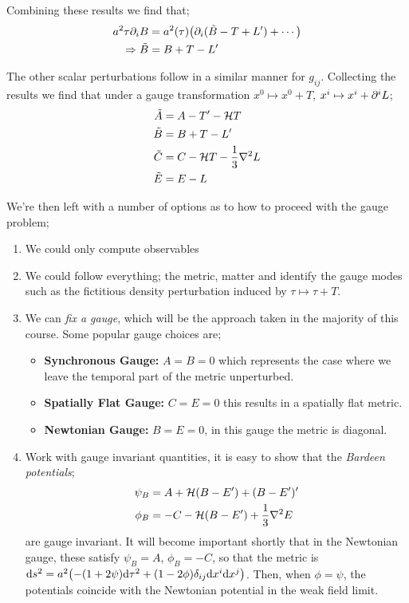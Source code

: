 Combining these results we find that;
\begin{align*}
a^2\tau \del_i B &= a^2(\tau)\left(\del_i(\tilde{B} - T + L\pr) + \cdots\right) \\
\Rightarrow \tilde{B} &= B + T - L\pr
\end{align*}
\begin{definitionbox}
The other scalar perturbations follow in a similar manner for $g_{ij}$. Collecting the results we find that under a gauge transformation $x^{0} \mapsto x^{0} + T$, $x^{i} \mapsto x^{i} + \partial^i L$;
\begin{align}
\tilde{A} &= A - T^{\prime} - \mathcal{H} T \\
\tilde{B} &= B + T - L^{\prime} \\
\tilde{C} &= C - \mathcal{H} T - \frac{1}{3}\nabla^2 L \\
\tilde{E} &= E - L
\end{align}
\end{definitionbox}
We're then left with a number of options as to how to proceed with the gauge problem;
\begin{enumerate}
\item We could only compute observables
\item We could follow everything; the metric, matter and identify the gauge modes such as the fictitious density perturbation induced by $\tau \mapsto \tau + T$.
\item We can \emph{fix a gauge}, which will be the approach taken in the majority of this course. Some popular gauge choices are;
\begin{itemize}
\item \textbf{Synchronous Gauge:} $A = B = 0$ which represents the case where we leave the temporal part of the metric unperturbed.
\item \textbf{Spatially Flat Gauge:} $C = E = 0$ this results in a spatially flat metric.
\item \textbf{Newtonian Gauge:} $B = E = 0$, in this gauge the metric is diagonal.
\end{itemize}
\item Work with gauge invariant quantities, it is easy to show that the \emph{Bardeen potentials};
\begin{align}
\psi_B &= A + \mathcal{H}(B - E^{\prime}) + (B - E^{\prime})^{\prime} \\
\phi_B &= -C - \mathcal{H}(B - E^{\prime}) + \frac{1}{3}\nabla^2 E
\end{align}
are gauge invariant. It will become important shortly that in the Newtonian gauge, these satisfy $\psi_B = A$, $\phi_B = -C$, so that the metric is $\ud s^2 = a^2\left(-(1 + 2\psi)\ud \tau^2 + (1 - 2\phi)\delta_{ij}\ud x^i \ud x^j\right)$. Then, when $\phi = \psi$, the potentials coincide with the Newtonian potential in the weak field limit.
\end{enumerate}
